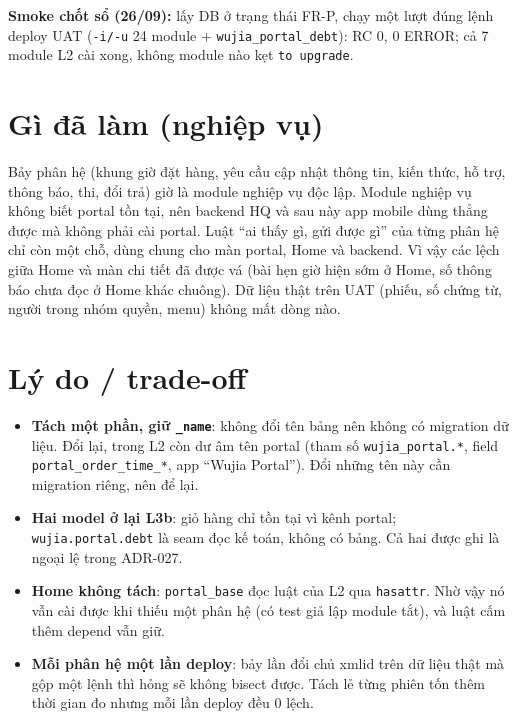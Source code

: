 \textbf{Smoke chốt sổ (26/09):} lấy DB ở trạng thái FR-P, chạy một lượt đúng lệnh deploy UAT (\texttt{-i/-u} 24 module
+ \texttt{wujia\_portal\_debt}): RC 0, 0 ERROR; cả 7 module L2 cài xong, không module nào kẹt \texttt{to upgrade}.

\section{Gì đã làm (nghiệp vụ)}

Bảy phân hệ (khung giờ đặt hàng, yêu cầu cập nhật thông tin, kiến thức, hỗ trợ, thông báo, thi, đổi trả) giờ là module
nghiệp vụ độc lập. Module nghiệp vụ không biết portal tồn tại, nên backend HQ và sau này app mobile dùng thẳng được mà
không phải cài portal. Luật ``ai thấy gì, gửi được gì'' của từng phân hệ chỉ còn một chỗ, dùng chung cho màn portal,
Home và backend. Vì vậy các lệch giữa Home và màn chi tiết đã được vá (bài hẹn giờ hiện sớm ở Home, số thông báo chưa
đọc ở Home khác chuông). Dữ liệu thật trên UAT (phiếu, số chứng từ, người trong nhóm quyền, menu) không mất dòng nào.

\section{Lý do / trade-off}

\begin{itemize}[nosep]
\item \textbf{Tách một phần, giữ \texttt{\_name}}: không đổi tên bảng nên không có migration dữ liệu. Đổi lại, trong L2 còn
  dư âm tên portal (tham số \texttt{wujia\_portal.*}, field \texttt{portal\_order\_time\_*}, app ``Wujia Portal''). Đổi
  những tên này cần migration riêng, nên để lại.
\item \textbf{Hai model ở lại L3b}: giỏ hàng chỉ tồn tại vì kênh portal; \texttt{wujia.portal.debt} là seam đọc kế toán,
  không có bảng. Cả hai được ghi là ngoại lệ trong ADR-027.
\item \textbf{Home không tách}: \texttt{portal\_base} đọc luật của L2 qua \texttt{hasattr}. Nhờ vậy nó vẫn cài được khi
  thiếu một phân hệ (có test giả lập module tắt), và luật cấm thêm depend vẫn giữ.
\item \textbf{Mỗi phân hệ một lần deploy}: bảy lần đổi chủ xmlid trên dữ liệu thật mà gộp một lệnh thì hỏng sẽ không
  bisect được. Tách lẻ từng phiên tốn thêm thời gian đo nhưng mỗi lần deploy đều 0 lệch.
\end{itemize}

